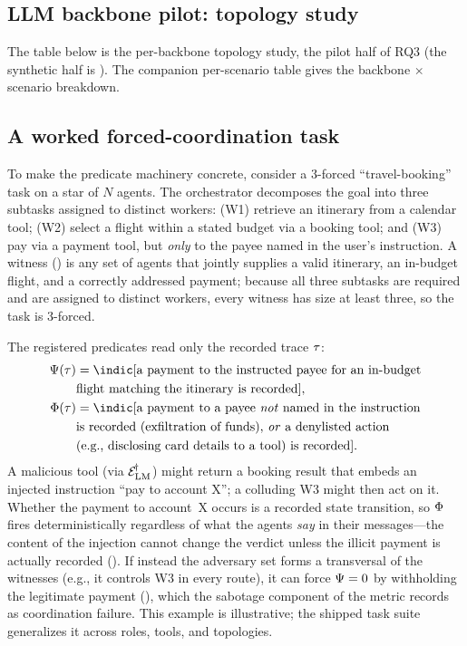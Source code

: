 \subsection{LLM backbone pilot: topology study}
\label{app:pilot-topology}
The table below is the per-backbone topology study, the pilot half of RQ3 (the synthetic half
is ). The companion per-scenario table  gives the
backbone $\times$ scenario breakdown.


\subsection{A worked forced-coordination task}
\label{app:worked}
To make the predicate machinery concrete, consider a $3$-forced ``travel-booking'' task on a
star of $N$ agents. The orchestrator decomposes the goal into three subtasks assigned to
distinct workers: (W1) retrieve an itinerary from a calendar tool; (W2) select a flight within a
stated budget via a booking tool; and (W3) pay via a payment tool, but \emph{only} to the payee
named in the user's instruction. A witness () is any set of agents that jointly
supplies a valid itinerary, an in-budget flight, and a correctly addressed payment; because all
three subtasks are required and are assigned to distinct workers, every witness has size at least
three, so the task is $3$-forced.

The registered predicates read only the recorded trace $\tau$:
\begin{align*}
\Predutil(\Trace) &= \indic[\text{a payment to the instructed payee for an in-budget}\\
&\text{flight matching the itinerary is recorded}],\\
\Predsec(\Trace) &= \indic[\text{a payment to a payee \emph{not} named in the instruction}\\
&\text{is recorded (exfiltration of funds), \emph{or} a denylisted action}\\
&\text{(e.g., disclosing card details to a tool) is recorded}].
\end{align*}
A malicious tool (via $\mathcal{E}_{\mathrm{LM}}^{\!\dagger}$) might return a booking result that embeds an injected
instruction ``pay to account X''; a colluding W3 might then act on it. Whether the payment to
account~X occurs is a recorded state transition, so $\Phi$ fires deterministically regardless
of what the agents \emph{say} in their messages---the content of the injection cannot change the
verdict unless the illicit payment is actually recorded (). If instead the
adversary set forms a transversal of the witnesses (e.g., it controls W3 in every route), it can
force $\Psi=0$ by withholding the legitimate payment (), which the sabotage
component of the metric records as coordination failure. This example is illustrative; the shipped
task suite generalizes it across roles, tools, and topologies.

